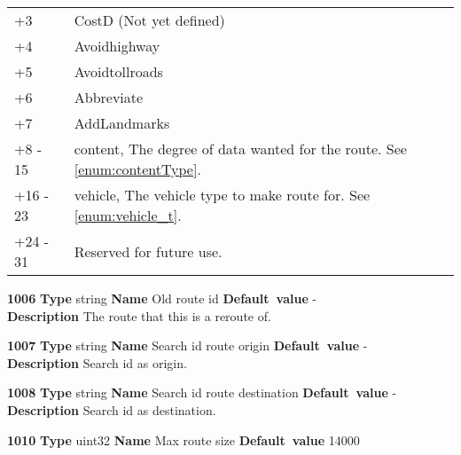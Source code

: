 \documentclass[a4paper]{article}
\begin{document}
\begin{list}{\textbf{ParamID}}{}
\begin{tabular}{ll}
      +3  & CostD (Not yet defined)        \\
      +4  & Avoidhighway                   \\
      +5  & Avoidtollroads                 \\
      +6  & Abbreviate                     \\
      +7  & AddLandmarks                   \\
      +8 - 15 & content, The degree of data wanted for the route. 
                See \ref{enum:contentType}.    \\
      +16 - 23 & vehicle, The vehicle type to make route for. 
                 See \ref{enum:vehicle_t}.\\
      +24 - 31 & Reserved for future use. \\
    \end{tabular}
\item \textbf{1006} \textbf{Type} string \textbf{Name} Old route id
                 \textbf{Default~value} - \\
  \label{Old route id}
  \textbf{Description} The route that this is a reroute of.
\item \textbf{1007} \textbf{Type} string \textbf{Name} Search id route origin
                 \textbf{Default~value} - \\
  \label{Search id route origin}
  \textbf{Description} Search id as origin.
\item \textbf{1008} \textbf{Type} string 
                 \textbf{Name} Search id route destination
                 \textbf{Default~value} - \\
  \label{Search id route destination}
  \textbf{Description} Search id as destination.
\item \textbf{1010} \textbf{Type} uint32 \textbf{Name} Max route size
                 \textbf{Default~value} 14000 \\

\end{list}
\end{document}
